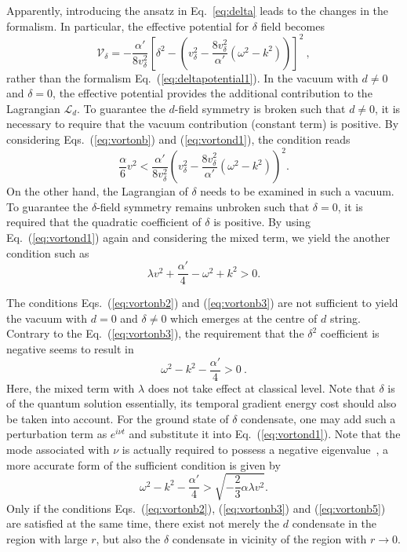 \documentclass[prd, showpacs,nofootinbib,amsmath,amssymb]{revtex4}
\begin{document}
Apparently, introducing the ansatz in Eq.~\ref{eq:delta} leads to the changes in the formalism.
In particular, the effective potential for $\delta$ field becomes
\begin{equation}
  \label{eq:vortond1}
  \mathcal{V}_\delta= -\frac{\alpha'}{8v_\delta^2} [\delta^2 - (v_\delta^2 - \frac{8v_\delta^2}{\alpha'}(\omega^2 -k^2))]^2 \ ,
\end{equation}
rather than the formalism Eq.~(\ref{eq:deltapotential1}).
In the vacuum with $d \neq 0$ and $\delta = 0$, the effective potential provides the additional
contribution to the Lagrangian $\mathcal{L}_d$. To guarantee the $d$-field symmetry is broken such
that $d \neq 0$, it is necessary to require that the vacuum contribution (constant term) is positive.
By considering Eqs.~(\ref{eq:vortonb}) and (\ref{eq:vortond1}), the condition reads
\begin{equation}
\label{eq:vortonb2}
  \frac{\alpha}{6} v^2 < \frac{\alpha'}{8v_\delta^2}(v_\delta^2  - \frac{8v_\delta^2}{\alpha'}(\omega^2 -k^2))^2.
\end{equation}
On the other hand, the Lagrangian of $\delta$ needs to be examined in such a vacuum. To guarantee the
$\delta$-field symmetry remains unbroken such that $\delta = 0$, it is required that the quadratic
coefficient of $\delta$ is positive. By using Eq.~(\ref{eq:vortond1}) again and considering the mixed
term, we yield the another condition such as
\begin{equation}
  \label{eq:vortonb3}
  \lambda v^2 + \frac{\alpha'}{4}- \omega^2 +k^2 > 0.
\end{equation}

The conditions Eqs.~(\ref{eq:vortonb2}) and (\ref{eq:vortonb3}) are not sufficient to yield the vacuum
with $d = 0$ and $\delta \neq 0$ which emerges at the centre of $d$ string. Contrary to the
Eq.~(\ref{eq:vortonb3}), the requirement that the $\delta^2$ coefficient is negative seems to result in
\begin{equation}
  \label{eq:vortonb4}
\omega^2 - k^2 -\frac{\alpha'}{4} > 0 \ .
\end{equation}
Here, the mixed term with $\lambda$ does not take effect at classical level. Note that $\delta$ is of
the quantum solution essentially, its temporal gradient energy cost should also be taken into account.
For the ground state of $\delta$ condensate, one may add such a perturbation term as $e^{i\nu t}$ and
substitute it into Eq.~(\ref{eq:vortond1}). Note that the mode associated with $\nu$ is actually required
to possess a negative eigenvalue~\cite{vilenkin2000cosmic,haws1988superconducting}, a more accurate form
of the sufficient condition is given by
\begin{equation}
  \label{eq:vortonb5}
  \omega^2 - k^2 -\frac{\alpha'}{4} > \sqrt{- \frac{2}{3}\alpha \lambda v^2}.
\end{equation}
Only if the conditions Eqs.~(\ref{eq:vortonb2}), (\ref{eq:vortonb3}) and (\ref{eq:vortonb5}) are
satisfied at the same time, there exist not merely the $d$ condensate in the region with large $r$, but
also the $\delta$ condensate in vicinity of the region with $r \rightarrow 0$.
\end{document}
